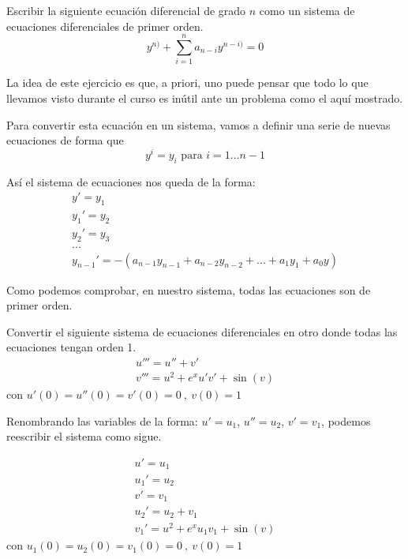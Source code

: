 \documentclass{apuntes}
\begin{document}
\begin{problem}[1]
Escribir la siguiente ecuación diferencial de grado $n$ como un sistema de ecuaciones diferenciales de primer orden.
\[y^{n)} + \sum_{i=1}^n a_{n-i}y^{n-i)} = 0\]

\solution
La idea de este ejercicio es que, a priori, uno puede pensar que todo lo que llevamos visto durante el curso es inútil ante un problema como el aquí mostrado.

Para convertir esta ecuación en un sistema, vamos a definir una serie de nuevas ecuaciones de forma que
\[y^{i} = y_i \text{ para } i=1...n-1\]

Así el sistema de ecuaciones nos queda de la forma:
\[\begin{array}{l}
y' = y_1\\
y_1' = y_2\\
y_2' = y_3 \\
...\\
y_{n-1}' = -\left( a_{n-1}y_{n-1} + a_{n-2}y_{n-2}+...+a_1y_1 + a_0 y\right)
\end{array} \]

Como podemos comprobar, en nuestro sistema, todas las ecuaciones son de primer orden.

\end{problem}

\begin{problem}[2]
Convertir el siguiente sistema de ecuaciones diferenciales en otro donde todas las ecuaciones tengan orden 1.
\[\begin{array}{l}
u''' = u''+v'\\
v''' = u^2+e^xu'v'+\sin(v)
\end{array} \]
con $u'(0)=u''(0)=v'(0)=0 \ , \ v(0)=1$
\solution

Renombrando las variables de la forma: $u' = u_1$, $u''=u_2$, $v'=v_1$, podemos reescribir el sistema como sigue.

\[\begin{array}{l}
u' = u_1\\
u_1'=u_2\\
v'=v_1\\
u_2' = u_2+v_1\\
v_1' = u^2+e^xu_1v_1 + \sin(v)
\end{array} \]
con $u_1(0)=u_2(0)=v_1(0)=0 \ , \ v(0)=1$

\end{problem}
\end{document}
